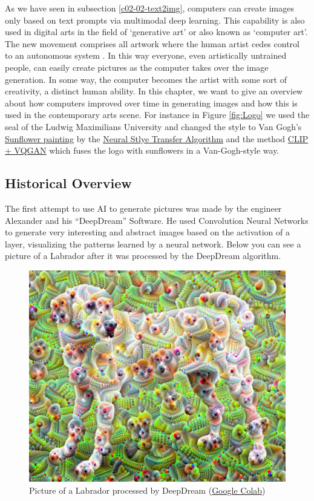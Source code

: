 \documentclass[
]{krantz}
\begin{document}
As we have seen in subsection \ref{c02-02-text2img}, computers can create images only based on text prompts via multimodal deep learning. This capability is also used in digital arts in the field of `generative art' or also known as `computer art'. The new movement comprises all artwork where the human artist cedes control to an autonomous system \citep{galanter2016generative}. In this way everyone, even artistically untrained people, can easily create pictures as the computer takes over the image generation. In some way, the computer becomes the artist with some sort of creativity, a distinct human ability. In this chapter, we want to give an overview about how computers improved over time in generating images and how this is used in the contemporary arts scene. For instance in Figure \ref{fig:Logo} we used the seal of the Ludwig Maximilians University and changed the style to Van Gogh's \href{https://wallpaperaccess.com/full/787825.jpg}{Sunflower painting} by the \href{https://www.tensorflow.org/tutorials/generative/style_transfer}{Neural Stlye Transfer Algorithm} and the method \href{https://colab.research.google.com/drive/1ZAus_gn2RhTZWzOWUpPERNC0Q8OhZRTZ\#scrollTo=FhhdWrSxQhwg}{CLIP + VQGAN} which fuses the logo with sunflowers in a Van-Gogh-style way.

\hypertarget{historical-overview}{%
\subsection{Historical Overview}\label{historical-overview}}

The first attempt to use AI to generate pictures was made by the engineer Alexander \citet{mordvintsev_2015} and his ``DeepDream'' Software. He used Convolution Neural Networks to generate very interesting and abstract images based on the activation of a layer, visualizing the patterns learned by a neural network. Below you can see a picture of a Labrador after it was processed by the DeepDream algorithm.

\begin{figure}

{\centering \includegraphics[width=0.5\linewidth]{./figures/03-chapter3/DeepDream} 

}

\caption{Picture of a Labrador processed by DeepDream (\href{https://www.tensorflow.org/tutorials/generative/deepdream}{Google Colab})}\label{fig:DeepDream}
\end{figure}
\end{document}
